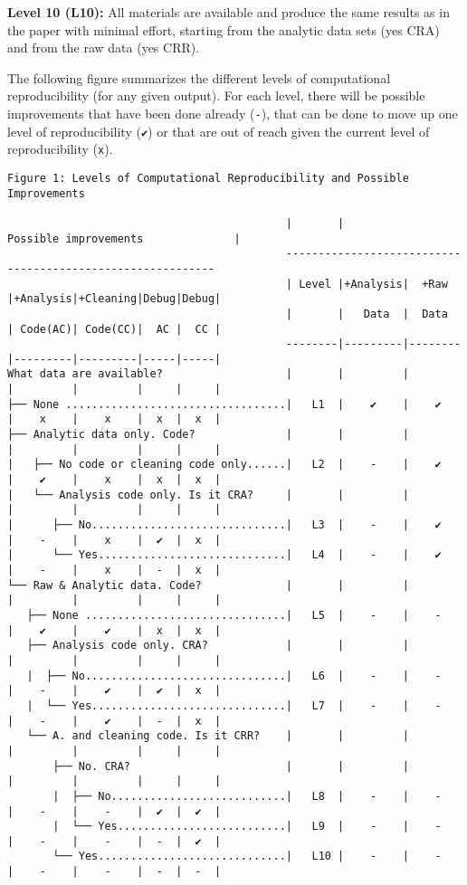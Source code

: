 \documentclass[]{book}
\begin{document}
\textbf{Level 10 (L10):} All materials are available and produce the same results as in the paper with minimal effort, starting from the analytic data sets (yes CRA) and from the raw data (yes CRR).

The following figure summarizes the different levels of computational reproducibility (for any given output). For each level, there will be possible improvements that have been done already (\texttt{-}), that can be done to move up one level of reproducibility (\texttt{✔}) or that are out of reach given the current level of reproducibility (\texttt{x}).

\begin{verbatim}
Figure 1: Levels of Computational Reproducibility and Possible Improvements   

                                           |       |               Possible improvements              |
                                           -----------------------------------------------------------
                                           | Level |+Analysis|  +Raw  |+Analysis|+Cleaning|Debug|Debug|
                                           |       |   Data  |  Data  | Code(AC)| Code(CC)|  AC |  CC |
                                           --------|---------|--------|---------|---------|-----|-----|
What data are available?                   |       |         |        |         |         |     |     |
├── None ..................................|   L1  |    ✔    |    ✔   |    x    |    x    |  x  |  x  |
├── Analytic data only. Code?              |       |         |        |         |         |     |     |
|   ├── No code or cleaning code only......|   L2  |    -    |    ✔   |    ✔    |    x    |  x  |  x  |
|   └── Analysis code only. Is it CRA?     |       |         |        |         |         |     |     |
|      ├── No..............................|   L3  |    -    |    ✔   |    -    |    x    |  ✔  |  x  |
|      └── Yes.............................|   L4  |    -    |    ✔   |    -    |    x    |  -  |  x  |
└── Raw & Analytic data. Code?             |       |         |        |         |         |     |     |
   ├── None ...............................|   L5  |    -    |    -   |    ✔    |    ✔    |  x  |  x  |
   ├── Analysis code only. CRA?            |       |         |        |         |         |     |     |
   |  ├── No...............................|   L6  |    -    |    -   |    -    |    ✔    |  ✔  |  x  |
   |  └── Yes..............................|   L7  |    -    |    -   |    -    |    ✔    |  -  |  x  |
   └── A. and cleaning code. Is it CRR?    |       |         |        |         |         |     |     |
       ├── No. CRA?                        |       |         |        |         |         |     |     |
       |  ├── No...........................|   L8  |    -    |    -   |    -    |    -    |  ✔  |  ✔  |
       |  └── Yes..........................|   L9  |    -    |    -   |    -    |    -    |  -  |  ✔  |
       └── Yes.............................|   L10 |    -    |    -   |    -    |    -    |  -  |  -  |
\end{verbatim}
\end{document}
